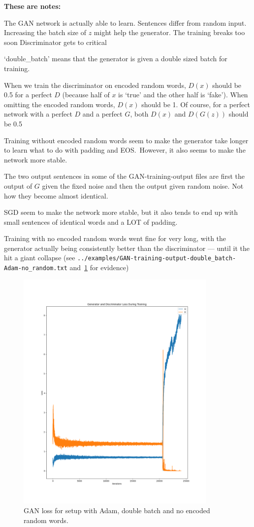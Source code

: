 \documentclass{article}
\begin{document}
\textbf{These are notes:}

The GAN network is actually able to learn.
Sentences differ from random input.
Increasing the batch size of $z$ might help the generator.
The training breaks too soon
Discriminator gets to critical

`double\_batch' means that the generator is given a double sized batch for
training.

When we train the discriminator on encoded random words, $D(x)$ should be 0.5
for a perfect $D$ (because half of $x$ is `true' and the other half is `fake').
When omitting the encoded random words, $D(x)$ should be 1. Of course, for a
perfect network with a perfect $D$ and a perfect $G$, both $D(x)$ and $D(G(z))$
should be 0.5 

Training without encoded random words seem to make the generator take longer to
learn what to do with padding and EOS.\ However, it also seems to make the
network more stable.

The two output sentences in some of the GAN-training-output files are first the
output of $G$ given the fixed noise and then the output given random noise. Not
how they become almost identical.

SGD seem to make the network more stable, but it also tends to end up with small
sentences of identical words and a LOT of padding.

Training with no encoded random words went fine for very long, with the
generator actually being consistently better than the discriminator --- until it
the hit a giant collapse (see
\texttt{../examples/GAN-training-output-double\_batch-Adam-no\_random.txt}
and~\ref{fig:doubleBatchAdamNoRandom} for evidence)

\begin{figure}[h]
    \captionsetup{width=\textwidth}
    \includegraphics[width=\textwidth,height=12cm]{GAN-loss-double_batch-Adam-no_random.png}
    \caption{%
        GAN loss for setup with Adam, double batch and no encoded random words.
    }\label{fig:doubleBatchAdamNoRandom}
\end{figure}
\end{document}
